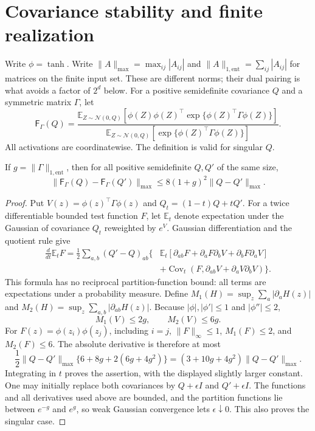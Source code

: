 \section{Covariance stability and finite realization}\label{sec:compression}
Write $\phi=\tanh$. Write $\|A\|_{\max}=\max_{ij}|A_{ij}|$ and
$\|A\|_{1,\mathrm{ent}}=\sum_{ij}|A_{ij}|$ for matrices on the finite input
set. These are different norms; their dual pairing is what avoids a factor
of $2^d$ below.
For a positive semidefinite covariance $Q$ and a symmetric matrix $\Gamma$,
let
\[
 \mathsf F_\Gamma(Q)=
 \frac{\mathbb E_{Z\sim\mathcal N(0,Q)}
 [\phi(Z)\phi(Z)^\top\exp\{\phi(Z)^\top\Gamma\phi(Z)\}]}
 {\mathbb E_{Z\sim\mathcal N(0,Q)}
 [\exp\{\phi(Z)^\top\Gamma\phi(Z)\}]}.
\]
All activations are coordinatewise. The definition is valid for singular $Q$.

\begin{lemma}\label{lem:tilted-covariance}
If $g=\|\Gamma\|_{1,\mathrm{ent}}$, then for all positive semidefinite
$Q,Q'$ of the same size,
\[
 \|\mathsf F_\Gamma(Q)-\mathsf F_\Gamma(Q')\|_{\max}
 \leq 8(1+g)^2\|Q-Q'\|_{\max}.
\]
\end{lemma}
\begin{proof}
Put $V(z)=\phi(z)^\top\Gamma\phi(z)$ and
$Q_t=(1-t)Q+tQ'$. For a twice differentiable bounded test function $F$, let
$\mathbb E_t$ denote expectation under the Gaussian of covariance $Q_t$
reweighted by $e^V$. Gaussian differentiation and the quotient rule give
\begin{align*}
 \frac{d}{dt}\mathbb E_tF
 =\frac12\sum_{a,b}(Q'-Q)_{ab}\bigl\{
 &\mathbb E_t[\partial_{ab}F+
       \partial_aF\partial_bV+\partial_bF\partial_aV]\\
 &+\operatorname{Cov}_t(F,\partial_{ab}V+
                                   \partial_aV\partial_bV)\bigr\}.
\end{align*}
This formula has no reciprocal partition-function bound: all terms are
expectations under a probability measure. Define
$M_1(H)=\sup_z\sum_a|\partial_aH(z)|$ and
$M_2(H)=\sup_z\sum_{a,b}|\partial_{ab}H(z)|$.
Because $|\phi|,|\phi'|\leq1$ and $|\phi''|\leq2$,
\[
 M_1(V)\leq2g,\qquad M_2(V)\leq6g.
\]
For $F(z)=\phi(z_i)\phi(z_j)$, including $i=j$,
$\|F\|_\infty\leq1$, $M_1(F)\leq2$, and $M_2(F)\leq6$.
The absolute derivative is therefore at most
\[
 \frac12\|Q-Q'\|_{\max}
 \{6+8g+2(6g+4g^2)\}
 =(3+10g+4g^2)\|Q-Q'\|_{\max}.
\]
Integrating in $t$ proves the assertion, with the displayed slightly larger
constant. One may initially replace both covariances by $Q+\epsilon I$ and
$Q'+\epsilon I$. The functions and all derivatives used above are bounded,
and the partition functions lie between $e^{-g}$ and $e^g$, so weak Gaussian
convergence lets $\epsilon\downarrow0$. This also proves the singular case.
\end{proof}

